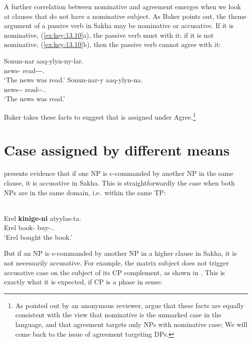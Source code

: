\documentclass[output=paper]{langsci/langscibook}
\begin{document}
A further correlation between nominative and agreement emerges when we look at
clauses that do not have a nominative subject. As Baker points out, the theme
argument of a passive verb in Sakha may be nominative or accusative. If it is
nominative, (\ref{ex:key:13.10}a), the passive verb must  with it; if it
is not nominative, (\ref{ex:key:13.10}b), then the passive verb cannot agree
with it:

\ea%
    \label{ex:key:13.10} \parencite[32]{Baker2015}
	\ea
	\gll  Sonun-nar aaq-ylyn-ny-lar.\\
    news-\Pl{}  read-\Pass{}-\Pst{}-\Tpl.\Sbj{}\\
	\glt     ‘The news was read.’
	\ex
	\gll  Sonun-nar-y aaq-ylyn-na.\\
	    news-\Pl{}-\Acc{}  read-\Pass{}-\Pst{}.\Tsg.\Sbj{}\\
	\glt     ‘The news was read.’
    \z
\z

Baker takes these facts to suggest that \Nom{} is assigned under
Agree.\footnote{As pointed out by an anonymous reviewer, \citet{LevPre2015}
    argue that these facts are equally consistent with the view that nominative
    is the unmarked case in the language, and that agreement targets only NPs
with nominative case; We will come back to the issue of agreement targeting \Nom{}
DPs.}

\section{Case assigned by different means}\label{sec:key:13.3}

\textcite[112f.]{Baker2015} presents evidence that if one NP is c-commanded by
another NP in the same clause, it is accusative in Sakha. This is
straightforwardly the case when both NPs are in the same domain, i.e.\ within
the same TP:

\ea%
    \label{ex:key:13.11} \parencite[112]{Baker2015}\\
    \gll  Erel  \textbf{kinige-ni}  atyylas-ta.\\
          Erel book-\Acc{}  buy-\Pst{}.\Tsg.\Sbj{}\\
    \glt  ‘Erel bought the book.’
\z

But if an NP is c-commanded by another NP in a higher clause in Sakha, it is
not necessarily accusative. For example, the matrix subject does not trigger
accusative case on the subject of its CP complement, as shown in
. This is exactly what it is expected, if CP is a
phase in
 sense:
\end{document}
